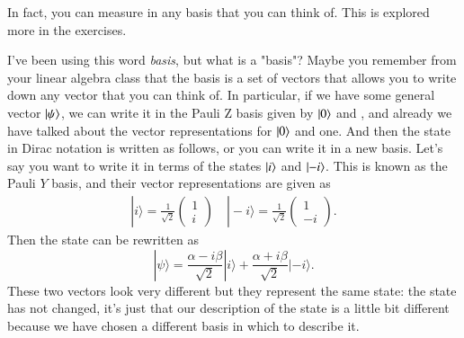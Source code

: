 In fact, you can measure in any basis that you can think of.  This is explored more in the exercises.

I've been using this word \emph{basis}, but what is a "basis"? Maybe you remember from your linear algebra class that the basis is a set of vectors that allows you to write down any vector that you can think of. In particular, if we have some general vector $\left| \psi \right\rangle$, we can write it in the Pauli Z basis given by $\left| 0 \right\rangle$ and , and already we have talked about the vector representations for $\left| 0 \right\rangle$ and one. And then the state in Dirac notation is written as follows, or you can write it in a new basis. Let's say you want to write it in terms of the states $\left| i \right\rangle$ and $\left| -i \right\rangle$. This is known as the Pauli $Y$ basis, and their vector representations are given as
\begin{align}
    |i\rangle=\frac{1}{\sqrt{2}}\left(\begin{array}{l}1 \\ i\end{array}\right) \quad|-i\rangle=\frac{1}{\sqrt{2}}\left(\begin{array}{c}1 \\ -i\end{array}\right).
\end{align}
Then the state can be rewritten as
\begin{equation}
|\psi\rangle=\frac{\alpha-i \beta}{\sqrt{2}}|i\rangle+\frac{\alpha+i \beta}{\sqrt{2}}|-i\rangle.
\end{equation}
These two vectors look very different but they represent the same state: the state has not changed, it's just that our description of the state is a little bit different because we have chosen a different basis in which to describe it.

